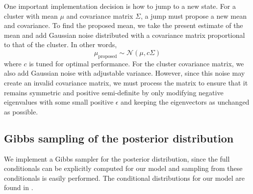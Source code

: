 \documentclass[twoside]{article}
\theoremstyle{theorem}
\theoremstyle{theorem}
\theoremstyle{theorem}
\theoremstyle{lemma}
\theoremstyle{definition}
\theoremstyle{example}
\begin{document}
One important implementation decision is how to jump to a new state. For a cluster with mean $\mu$ and covariance matrix $\Sigma$, a jump must propose a new mean and covariance. To find the proposed mean, we take the present estimate of the mean and add Gaussian noise distributed with a covariance matrix proportional to that of the cluster. In other words,
$$\mu_\text{proposed} \sim \mathcal{N}(\mu, c\Sigma)$$
where $c$ is tuned for optimal performance. For the cluster covariance matrix, we also add Gaussian noise with adjustable variance. However, since this noise may create an invalid covariance matrix, we must process the matrix to ensure that it remains symmetric and positive semi-definite by only modifying negative eigenvalues with some small positive $\epsilon$ and keeping the eigenvectors as unchanged as possible.

\subsection{Gibbs sampling of the posterior distribution}
We implement a Gibbs sampler for the posterior distribution, since the full conditionals can be explicitly computed for our model and sampling from these conditionals is easily performed. 
The conditional distributions for our model are found in \cite{Gelman, Jones}. 
\end{document}
